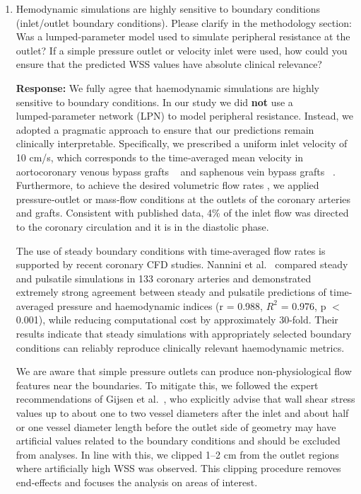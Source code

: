 \documentclass[11pt]{article}
\begin{document}
\begin{enumerate}[]
    \item Hemodynamic simulations are highly sensitive to boundary conditions (inlet/outlet boundary conditions). Please clarify in the methodology section: Was a lumped-parameter model used to simulate peripheral resistance at the outlet? If a simple pressure outlet or velocity inlet were used, how could you ensure that the predicted WSS values have absolute clinical relevance?

    \textbf{Response:} We fully agree that haemodynamic simulations are highly sensitive to boundary conditions. In our study we did \textbf{not} use a lumped‑parameter network (LPN) to model peripheral resistance. Instead, we adopted a pragmatic approach to ensure that our predictions remain clinically interpretable. Specifically, we prescribed a uniform inlet velocity of 10 cm/s, which corresponds to the time‑averaged mean velocity in aortocoronary venous bypass grafts ~\cite{Simon1982} and saphenous vein bypass grafts ~\cite{Louagie1999}. Furthermore, to achieve the desired volumetric flow rates \cite{Khan2020}, we applied pressure‑outlet or mass‑flow conditions at the outlets of the coronary arteries and grafts. Consistent with published data, 4\% of the inlet flow was directed to the coronary circulation and it is in the diastolic phase.


The use of steady boundary conditions with time-averaged flow rates is supported by recent coronary CFD studies. Nannini et al.~\cite{Nannini2024} compared steady and pulsatile simulations in 133 coronary arteries and demonstrated extremely strong agreement between steady and pulsatile predictions of time-averaged pressure and haemodynamic indices (r = 0.988, $R^2$ = 0.976, p $<$ 0.001), while reducing computational cost by approximately 30-fold. Their results indicate that steady simulations with appropriately selected boundary conditions can reliably reproduce clinically relevant haemodynamic metrics.


We are aware that simple pressure outlets can produce non‑physiological flow features near the boundaries. To mitigate this, we followed the expert recommendations of Gijsen et al.~\cite{Gijsen2019}, who explicitly advise that wall shear stress values up to about one to two vessel diameters after the inlet and about half or one vessel diameter length before the outlet side of geometry may have artificial values related to the boundary conditions and should be excluded from analyses. In line with this, we clipped 1–2 cm from the outlet regions where artificially high WSS was observed. This clipping procedure removes end‑effects and focuses the analysis on areas of interest.



\end{enumerate}
\end{document}
